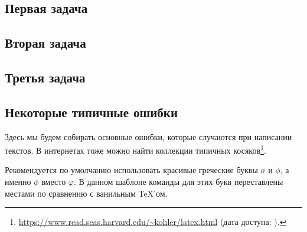 \subsection{Первая задача}
\label{subsec:task1}

\subsection{Вторая задача}
\label{subsec:task2}

\subsection{Третья задача}
\label{subsec:task3}

\subsection{Некоторые типичные ошибки}
Здесь мы будем собирать основные ошибки, которые случаются при написании текстов.
В интернетах тоже можно найти коллекции типич\-ных косяков\footnote{\href{https://www.read.seas.harvard.edu/~kohler/latex.html}{https://www.read.seas.harvard.edu/\textasciitilde kohler/latex.html} (дата доступа: ).}.

Рекомендуется по-умол\-ча\-нию использовать красивые греческие бук\-вы $\sigma$  и $\phi$, а именно $\phi$ вместо $\varphi$. В данном шаблоне команды для этих букв переставлены местами по сравнению с ванильным \TeX'ом.

